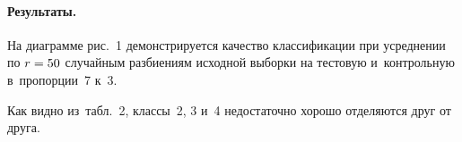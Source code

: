 \begin{multicols}{2}
\vspace*{-12pt}

\paragraph*{Результаты.}
На диаграмме рис.~1 демонстрируется качество классификации при усреднении по 
$r\hm=50$  случайным разбиениям исходной выборки на тес\-то\-вую и~контрольную 
в~пропорции~7 к~3.





Как видно из~табл.~2, классы~2, 3 и~4 недостаточно хорошо отделяются друг от друга.

\pagebreak

\end{multicols}
\begin{figure*} %
 \vspace*{1pt}
 \begin{minipage}[t]{80mm}
 \begin{center}  
 \mbox{%
\epsfxsize=78.057mm
}
\end{center}
\vspace*{-11pt}
\end{minipage}
\hfill
 \vspace*{1pt}
  \begin{minipage}[t]{80mm}
 \begin{center}  
 \mbox{%
\epsfxsize=78.057mm
}
\end{center}
\vspace*{-11pt}
\end{minipage}
\end{figure*}

